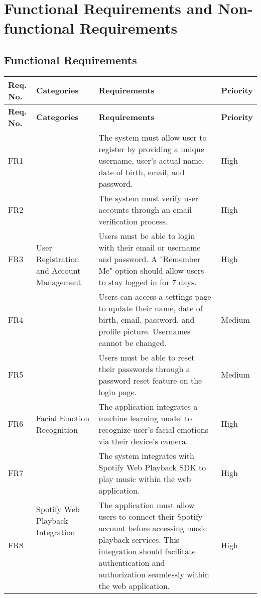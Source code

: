 \section{Functional Requirements and Non-functional Requirements}
\subsection{Functional Requirements}
\begin{longtable}{ |m{1cm}|m{3.5cm}|m{7cm}|m{1.5cm}| }
    \hline
    \rowcolor{lightgray}
    \textbf{Req. No.} & \textbf{Categories} & \textbf{Requirements} & \textbf{Priority} \\
    \hline
    \endfirsthead

    \hline
    \rowcolor{lightgray}
    \textbf{Req. No.} & \textbf{Categories} & \textbf{Requirements} & \textbf{Priority} \\
    \hline
    \endhead
    FR1 & \multirow{5}{=}{User Registration and Account Management} & The system must allow user to register by providing a unique username, user's actual name, date of birth, email, and password. & High \\
    \cline{1-1} \cline{3-4}
    FR2 &  & The system must verify user accounts through an email verification process. & High \\
    \cline{1-1} \cline{3-4}
    FR3 &  & Users must be able to login with their email or username and password. A "Remember Me" option should allow users to stay logged in for 7 days. & High \\
    \cline{1-1} \cline{3-4}
    FR4 &  & Users can access a settings page to update their name, date of birth, email, password, and profile picture. Usernames cannot be changed. & Medium \\
    \cline{1-1} \cline{3-4}
    FR5 &  & Users must be able to reset their passwords through a password reset feature on the login page. & Medium \\
    \hline
    FR6 & Facial Emotion Recognition & The application integrates a machine learning model to recognize user's facial emotions via their device's camera. & High \\
    \hline
    FR7 & \multirow{2}{=}{Spotify Web Playback Integration} & The system integrates with Spotify Web Playback SDK to play music within the web application. & High \\
    \cline{1-1} \cline{3-4}
    FR8 &  & The application must allow users to connect their Spotify account before accessing music playback services. This integration should facilitate authentication and authorization seamlessly within the web application. & High \\

\end{longtable}
